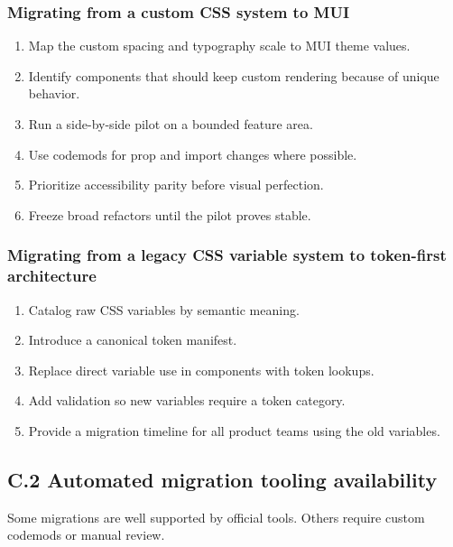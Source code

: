 \subsubsection*{Migrating from a custom CSS system to MUI}
\begin{enumerate}[leftmargin=*, itemsep=0.35em]
  \item Map the custom spacing and typography scale to MUI theme values.
  \item Identify components that should keep custom rendering because of unique behavior.
  \item Run a side-by-side pilot on a bounded feature area.
  \item Use codemods for prop and import changes where possible.
  \item Prioritize accessibility parity before visual perfection.
  \item Freeze broad refactors until the pilot proves stable.
\end{enumerate}

\subsubsection*{Migrating from a legacy CSS variable system to token-first architecture}
\begin{enumerate}[leftmargin=*, itemsep=0.35em]
  \item Catalog raw CSS variables by semantic meaning.
  \item Introduce a canonical token manifest.
  \item Replace direct variable use in components with token lookups.
  \item Add validation so new variables require a token category.
  \item Provide a migration timeline for all product teams using the old variables.
\end{enumerate}

\subsection*{C.2 Automated migration tooling availability}
Some migrations are well supported by official tools. Others require custom codemods or manual review.

